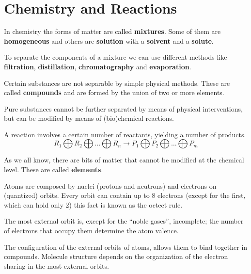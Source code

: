 \chapter{Chemistry and Reactions}
\begin{definition}
    In chemistry the forms of matter are called \textbf{mixtures}. Some of them
    are \textbf{homogeneous} and others are \textbf{solution} with a \textbf{solvent}
    and a \textbf{solute}.

    To separate the components of a mixture we can use different methods like
    \textbf{filtration}, \textbf{distillation}, \textbf{chromatography} and
    \textbf{evaporation}.
\end{definition}
\begin{definition}
    Certain substances are not separable by simple physical methods. These are
    called \textbf{compounds} and are formed by the union of two or more elements.
\end{definition}
\begin{definition}
    Pure substances cannot be further separated by means of physical interventions,
    but can be modified by means of (bio)chemical reactions.

    A reaction involves a certain number of reactants, yielding a number of products.
    \begin{equation}
        R_1 \bigoplus R_2 \bigoplus \ldots \bigoplus R_n \rightarrow P_1
        \bigoplus P_2 \bigoplus \ldots \bigoplus P_m
    \end{equation}

    As we all know, there are bits of matter that cannot be modified at the
    chemical level. These are called \textbf{elements}.
\end{definition}
\begin{definition}
    Atoms are composed by nuclei (protons and neutrons) and electrons on (quantized)
    orbits. Every orbit can contain up to 8 electrons (except for the first,
    which can hold only 2) this fact is known as the octect rule.

    The most external orbit is, except for the “noble gases”, incomplete; the
    number of electrons that occupy them determine the atom valence.
\end{definition}

The configuration of the external orbits of atoms, allows them to bind together
in compounds. Molecule structure depends on the organization of the electron
sharing in the most external orbits.

